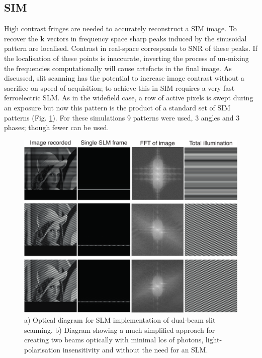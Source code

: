 \subsection{SIM}
High contrast fringes are needed to accurately reconstruct a SIM image.
To recover the $\mathbf{k}$ vectors in frequency space sharp peaks induced by the sinusoidal pattern are localised.
Contrast in real-space corresponds to SNR of these peaks.
If the localisation of these points is inaccurate, inverting the process of un-mixing the frequencies computationally will cause artefacts in the final image.
As discussed, slit scanning has the potential to increase image contrast without a sacrifice on speed of acquisition; to achieve this in SIM requires a very fast ferroelectric SLM.
As in the widefield case, a row of active pixels is swept during an exposure but now this pattern is the product of a standard set of SIM patterns (Fig. \ref{fig:sim_slit}).
For these simulations 9 patterns were used, 3 angles and 3 phases; though fewer can be used.

\begin{figure}
  \centering
  \includegraphics{sim_slit}
  \caption{a) Optical diagram for SLM implementation of dual-beam slit scanning.
           b) Diagram showing a much simplified approach for creating two beams optically with minimal los of photons, light-polarisation insensitivity and without the need for an SLM.}
  \label{fig:sim_slit}
\end{figure}

